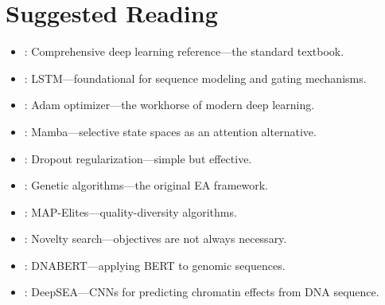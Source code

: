 \section*{Suggested Reading}
\begin{itemize}[leftmargin=1.5em]
  \item \citet{goodfellow2016}: Comprehensive deep learning reference---the standard textbook.
  \item \citet{hochreiter1997}: LSTM---foundational for sequence modeling and gating mechanisms.
  \item \citet{kingma2015}: Adam optimizer---the workhorse of modern deep learning.
  \item \citet{gu2023mamba}: Mamba---selective state spaces as an attention alternative.
  \item \citet{srivastava2014}: Dropout regularization---simple but effective.
  \item \citet{holland1975}: Genetic algorithms---the original EA framework.
  \item \citet{mouret2015}: MAP-Elites---quality-diversity algorithms.
  \item \citet{lehman2011}: Novelty search---objectives are not always necessary.
  \item \citet{ji2021dnabert}: DNABERT---applying BERT to genomic sequences.
  \item \citet{zhou2015}: DeepSEA---CNNs for predicting chromatin effects from DNA sequence.
\end{itemize}
